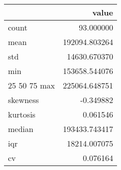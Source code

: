 \begin{tabular}{lr}
\toprule
 & value \\
\midrule
count & 93.000000 \\
mean & 192094.803264 \\
std & 14630.670370 \\
min & 153658.544076 \\
25%
50%
75%
max & 225064.648751 \\
skewness & -0.349882 \\
kurtosis & 0.061546 \\
median & 193433.743417 \\
iqr & 18214.007075 \\
cv & 0.076164 \\
\bottomrule
\end{tabular}
